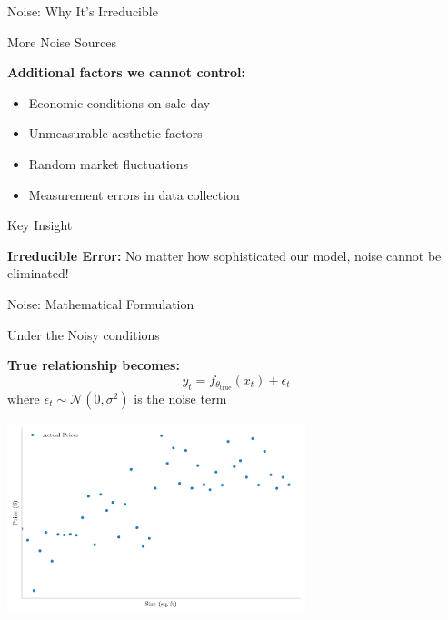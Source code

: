 \documentclass[10pt]{beamer}
\newcommand{\fitpic}[1]{\begin{adjustbox}{max width=\linewidth, max totalheight=0.78\textheight}#1\end{adjustbox}}
\begin{document}
\begin{frame}{Noise: Why It's Irreducible}
\small
\begin{examplebox}{More Noise Sources}
\raggedright
\textbf{Additional factors we cannot control:}
\begin{itemize}
\item Economic conditions on sale day
\item Unmeasurable aesthetic factors
\item Random market fluctuations
\item Measurement errors in data collection
\end{itemize}
\end{examplebox}

\begin{alertbox}{Key Insight}
\raggedright
\textbf{Irreducible Error:} No matter how sophisticated our model, noise cannot be eliminated!
\end{alertbox}
\end{frame}

\begin{frame}{Noise: Mathematical Formulation}
\small
\begin{keypointsbox}{Under the Noisy conditions}
\raggedright
\textbf{True relationship becomes:}
$$y_t = f_{\theta_{\text{true}}}(x_t) + \epsilon_t$$
where $\epsilon_t \sim \mathcal{N}(0, \sigma^2)$ is the noise term
\end{keypointsbox}

\begin{center}
\fitpic{\includegraphics[width=0.65\textwidth]{../assets/bias-variance/figures/data.pdf}}
\end{center}
\end{frame}
\end{document}
